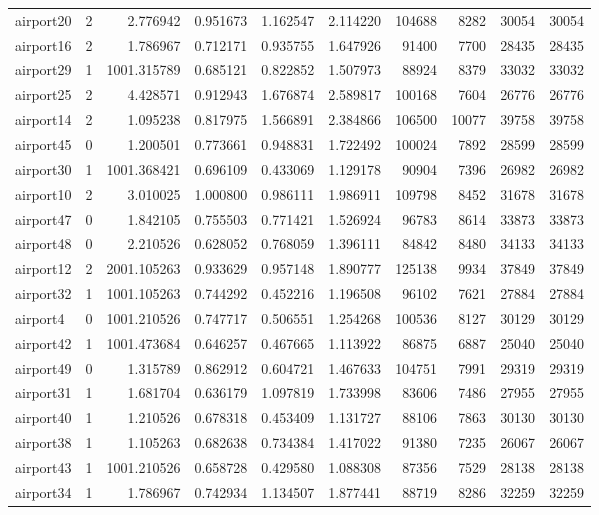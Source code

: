 \begin{longtable}{|l|r|r|r|r|r|r|r|r|r|}
airport20 & 2 & 2.776942 & 0.951673 & 1.162547 & 2.114220 & 104688 & 8282 & 30054 & 30054 \\
airport16 & 2 & 1.786967 & 0.712171 & 0.935755 & 1.647926 & 91400 & 7700 & 28435 & 28435 \\
airport29 & 1 & 1001.315789 & 0.685121 & 0.822852 & 1.507973 & 88924 & 8379 & 33032 & 33032 \\
airport25 & 2 & 4.428571 & 0.912943 & 1.676874 & 2.589817 & 100168 & 7604 & 26776 & 26776 \\
airport14 & 2 & 1.095238 & 0.817975 & 1.566891 & 2.384866 & 106500 & 10077 & 39758 & 39758 \\
airport45 & 0 & 1.200501 & 0.773661 & 0.948831 & 1.722492 & 100024 & 7892 & 28599 & 28599 \\
airport30 & 1 & 1001.368421 & 0.696109 & 0.433069 & 1.129178 & 90904 & 7396 & 26982 & 26982 \\
airport10 & 2 & 3.010025 & 1.000800 & 0.986111 & 1.986911 & 109798 & 8452 & 31678 & 31678 \\
airport47 & 0 & 1.842105 & 0.755503 & 0.771421 & 1.526924 & 96783 & 8614 & 33873 & 33873 \\
airport48 & 0 & 2.210526 & 0.628052 & 0.768059 & 1.396111 & 84842 & 8480 & 34133 & 34133 \\
airport12 & 2 & 2001.105263 & 0.933629 & 0.957148 & 1.890777 & 125138 & 9934 & 37849 & 37849 \\
airport32 & 1 & 1001.105263 & 0.744292 & 0.452216 & 1.196508 & 96102 & 7621 & 27884 & 27884 \\
airport4 & 0 & 1001.210526 & 0.747717 & 0.506551 & 1.254268 & 100536 & 8127 & 30129 & 30129 \\
airport42 & 1 & 1001.473684 & 0.646257 & 0.467665 & 1.113922 & 86875 & 6887 & 25040 & 25040 \\
airport49 & 0 & 1.315789 & 0.862912 & 0.604721 & 1.467633 & 104751 & 7991 & 29319 & 29319 \\
airport31 & 1 & 1.681704 & 0.636179 & 1.097819 & 1.733998 & 83606 & 7486 & 27955 & 27955 \\
airport40 & 1 & 1.210526 & 0.678318 & 0.453409 & 1.131727 & 88106 & 7863 & 30130 & 30130 \\
airport38 & 1 & 1.105263 & 0.682638 & 0.734384 & 1.417022 & 91380 & 7235 & 26067 & 26067 \\
airport43 & 1 & 1001.210526 & 0.658728 & 0.429580 & 1.088308 & 87356 & 7529 & 28138 & 28138 \\
airport34 & 1 & 1.786967 & 0.742934 & 1.134507 & 1.877441 & 88719 & 8286 & 32259 & 32259 \\

\end{longtable}
